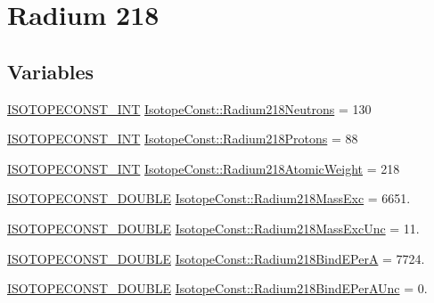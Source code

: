 \hypertarget{group___isotope_const-_radium-_ra218}{}\section{Radium 218}
\label{group___isotope_const-_radium-_ra218}
\subsection*{Variables}
\begin{DoxyCompactItemize}
\item 
\mbox{\hyperlink{group___isotope_const-_macros_ga5f18360b3e99483a35c32d789e62621c}{I\+S\+O\+T\+O\+P\+E\+C\+O\+N\+S\+T\+\_\+\+I\+NT}} \mbox{\hyperlink{group___isotope_const-_radium-_ra218_gad692e8605447178343acfaf653dd20a9}{Isotope\+Const\+::\+Radium218\+Neutrons}} = 130
\item 
\mbox{\hyperlink{group___isotope_const-_macros_ga5f18360b3e99483a35c32d789e62621c}{I\+S\+O\+T\+O\+P\+E\+C\+O\+N\+S\+T\+\_\+\+I\+NT}} \mbox{\hyperlink{group___isotope_const-_radium-_ra218_ga567b555f136f3eb97d30771dfcba338f}{Isotope\+Const\+::\+Radium218\+Protons}} = 88
\item 
\mbox{\hyperlink{group___isotope_const-_macros_ga5f18360b3e99483a35c32d789e62621c}{I\+S\+O\+T\+O\+P\+E\+C\+O\+N\+S\+T\+\_\+\+I\+NT}} \mbox{\hyperlink{group___isotope_const-_radium-_ra218_ga18c036a2c9a7d29d07e9b0b437cc6f24}{Isotope\+Const\+::\+Radium218\+Atomic\+Weight}} = 218
\item 
\mbox{\hyperlink{group___isotope_const-_macros_ga8f45a7272ce02c0b4c65c44636ed719a}{I\+S\+O\+T\+O\+P\+E\+C\+O\+N\+S\+T\+\_\+\+D\+O\+U\+B\+LE}} \mbox{\hyperlink{group___isotope_const-_radium-_ra218_gab3b3e6fd7c126c8f7a1de83d2bc8dcac}{Isotope\+Const\+::\+Radium218\+Mass\+Exc}} = 6651.
\item 
\mbox{\hyperlink{group___isotope_const-_macros_ga8f45a7272ce02c0b4c65c44636ed719a}{I\+S\+O\+T\+O\+P\+E\+C\+O\+N\+S\+T\+\_\+\+D\+O\+U\+B\+LE}} \mbox{\hyperlink{group___isotope_const-_radium-_ra218_gaf925629ac900b5d4f6fb1984c3b4c662}{Isotope\+Const\+::\+Radium218\+Mass\+Exc\+Unc}} = 11.
\item 
\mbox{\hyperlink{group___isotope_const-_macros_ga8f45a7272ce02c0b4c65c44636ed719a}{I\+S\+O\+T\+O\+P\+E\+C\+O\+N\+S\+T\+\_\+\+D\+O\+U\+B\+LE}} \mbox{\hyperlink{group___isotope_const-_radium-_ra218_ga16710ac55004e52e3654d32f5bdbfc7b}{Isotope\+Const\+::\+Radium218\+Bind\+E\+PerA}} = 7724.
\item 
\mbox{\hyperlink{group___isotope_const-_macros_ga8f45a7272ce02c0b4c65c44636ed719a}{I\+S\+O\+T\+O\+P\+E\+C\+O\+N\+S\+T\+\_\+\+D\+O\+U\+B\+LE}} \mbox{\hyperlink{group___isotope_const-_radium-_ra218_ga20a20cd0eb634d9aeb16e0ce18ce6583}{Isotope\+Const\+::\+Radium218\+Bind\+E\+Per\+A\+Unc}} = 0.

\end{DoxyCompactItemize}
